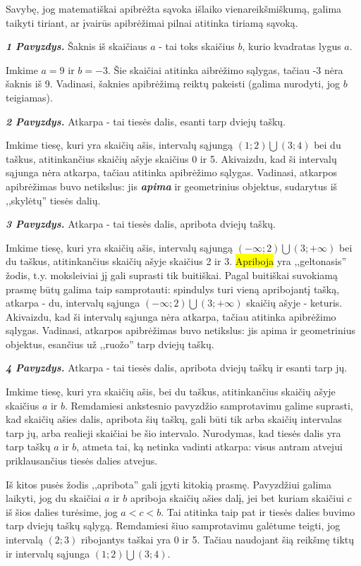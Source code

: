 \documentclass{article}
\begin{document}
Savybę, jog matematiškai apibrėžta sąvoka išlaiko vienareikšmiškumą, galima taikyti tiriant, ar įvairūs apibrėžimai pilnai atitinka tiriamą sąvoką. 

\textbf{\textit{1 Pavyzdys.}} Šaknis iš skaičiaus $a$ - tai toks skaičius $b$, kurio kvadratas lygus $a$.

Imkime $a=9$ ir $b=-3$. Šie skaičiai atitinka aibrėžimo sąlygas, tačiau -3 nėra šaknis iš 9. Vadinasi, šaknies apibrėžimą reiktų pakeisti (galima nurodyti, jog $b$ teigiamas).

\textbf{\textit{2 Pavyzdys.}} Atkarpa - tai tiesės dalis, esanti tarp dviejų taškų.

Imkime tiesę, kuri yra skaičių ašis, intervalų sąjungą $(1;2)\bigcup (3;4)$ bei du taškus, atitinkančius skaičių ašyje skaičius 0 ir 5. Akivaizdu, kad ši intervalų sąjunga nėra atkarpa, tačiau atitinka apibrėžimo sąlygas. Vadinasi, atkarpos apibrėžimas buvo netikslus: jis \textbf{\textit{apima}} ir geometrinius objektus, sudarytus iš ,,skylėtų'' tiesės dalių.

\textbf{\textit{3 Pavyzdys.}} Atkarpa - tai tiesės dalis, apribota dviejų taškų.

Imkime tiesę, kuri yra skaičių ašis, intervalų sąjungą $(-\infty;2)\bigcup (3;+\infty)$ bei du taškus, atitinkančius skaičių ašyje skaičius 2 ir 3. \colorbox{yellow}{Apriboja} yra ,,geltonasis'' žodis, t.y. moksleiviai jį gali suprasti tik buitiškai. Pagal buitiškai suvokiamą prasmę būtų galima taip samprotauti: spindulys turi vieną apribojantį tašką, atkarpa - du, intervalų sąjunga $(-\infty;2)\bigcup (3;+\infty)$ skaičių ašyje - keturis. Akivaizdu, kad ši intervalų sąjunga nėra atkarpa, tačiau atitinka apibrėžimo sąlygas. Vadinasi, atkarpos apibrėžimas buvo netikslus: jis apima ir geometrinius objektus, esančius už ,,ruožo'' tarp dviejų taškų.

\textbf{\textit{4 Pavyzdys.}} Atkarpa - tai tiesės dalis, apribota dviejų taškų ir esanti tarp jų. 

Imkime tiesę, kuri yra skaičių ašis, bei du taškus, atitinkančius skaičių ašyje skaičius $a$ ir $b$. Remdamiesi ankstesnio pavyzdžio samprotavimu galime suprasti, kad skaičių ašies dalis, apribota šių taškų, gali būti tik arba skaičių intervalas tarp jų, arba realieji skaičiai be šio intervalo. Nurodymas, kad tiesės dalis yra tarp taškų $a$ ir $b$, atmeta tai, ką netinka vadinti atkarpa: visus antram atvejui priklausančius tiesės dalies atvejus.

Iš kitos pusės žodis ,,apribota'' gali įgyti kitokią prasmę. Pavyzdžiui galima laikyti, jog du skaičiai $a$ ir $b$ apriboja skaičių ašies dalį, jei bet kuriam skaičiui $c$ iš šios dalies turėsime, jog $a<c<b$. Tai atitinka taip pat ir tiesės dalies buvimo tarp dviejų taškų sąlygą. Remdamiesi šiuo samprotavimu galėtume teigti, jog intervalą $(2; 3)$ ribojantys taškai yra 0 ir 5. Tačiau naudojant šią reikšmę tiktų ir intervalų sąjunga $(1;2)\bigcup (3;4)$. 
\end{document}
